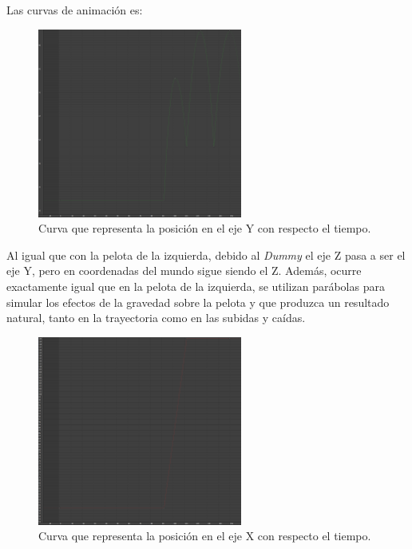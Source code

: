 \newpage

Las curvas de animación es:

\begin{figure}[H]
    \centering
    \includegraphics[width=0.6\textwidth]{imagenes/curvas/PR/pelota/green.png}
    \caption{Curva que representa la posición en el eje Y con respecto el tiempo.}
\end{figure}

Al igual que con la pelota de la izquierda, debido al \textit{Dummy} el eje Z pasa a ser el eje Y, pero en coordenadas del mundo sigue siendo el Z. Además, ocurre exactamente igual que en la pelota de la izquierda, se utilizan parábolas para simular los efectos de la gravedad sobre la pelota y que produzca un resultado natural, tanto en la trayectoria como en las subidas y caídas.

\begin{figure}[H]
    \centering
    \includegraphics[width=0.6\textwidth]{imagenes/curvas/PR/pelota/red.png}
    \caption{Curva que representa la posición en el eje X con respecto el tiempo.}
\end{figure}

